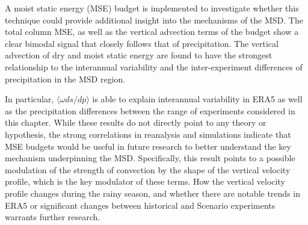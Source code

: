 A moist static energy (MSE) budget is implemented to investigate whether this technique could provide additional insight into the mechanisms of the MSD. The total column MSE, as well as the vertical advection terms of the budget show a clear bimodal signal that closely follows that of precipitation. The vertical advection of dry and moist static energy are found to have the strongest relationship to the interannual variability and the inter-experiment differences of precipitation in the MSD region. 

In particular, $\langle \omega ds/dp \rangle$ is able to explain interannual variability in ERA5 as well as the precipitation differences between the range of experiments considered in this chapter. While these results do not directly point to any theory or hypothesis, the strong correlations in reanalysis and simulations indicate that MSE budgets would be useful in future research to better understand the key mechanism underpinning the MSD. Specifically, this result points to a possible modulation of the strength of convection by the shape of the vertical velocity profile, which is the key modulator of these terms. How the vertical velocity profile changes during the rainy season, and whether there are notable trends in ERA5 or significant changes between historical and Scenario experiments warrants further research.
 
 
